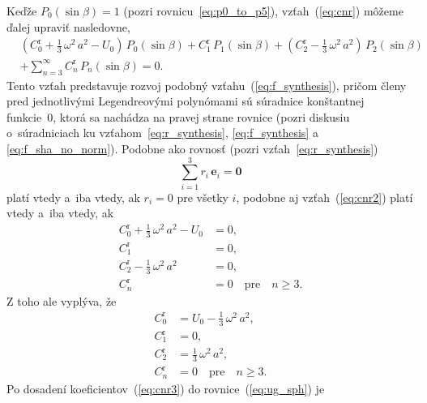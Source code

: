 \documentclass[a4paper,12pt]{book}
\let\vec\mathbf
\begin{document}
Keďže $P_0(\sin\beta) = 1$ (pozri rovnicu~\ref{eq:p0_to_p5}), 
vzťah~(\ref{eq:cnr}) môžeme ďalej upraviť nasledovne,
%
\begin{equation}
\label{eq:cnr2}
\begin{split}
&\left( C_0^\mathrm{r} + \frac{1}{3} \, \omega^2 \, a^2 - U_0 \right) \, 
P_0(\sin\beta) + C_1^\mathrm{r} \, P_1(\sin\beta) + \left(C_2^\mathrm{r} 
- \frac{1}{3} \, \omega^2 \, a^2 \right) \, P_2(\sin\beta)\\
%
&+ \sum_{n = 3}^\infty C^{\mathrm{r}}_n \, P_n(\sin\beta) = 0{.}
\end{split}
\end{equation}
%
Tento vzťah predstavuje rozvoj podobný vzťahu~(\ref{eq:f_synthesis}), pričom 
členy pred jednotlivými Legendreovými polynómami sú súradnice konštantnej 
funkcie~0, ktorá sa nachádza na pravej strane rovnice (pozri diskusiu 
o~súradniciach ku vzťahom~\ref{eq:r_synthesis}, \ref{eq:f_synthesis} 
a \ref{eq:f_sha_no_norm}).  Podobne ako rovnosť (pozri 
vzťah~\ref{eq:r_synthesis})
%
\begin{equation}
\sum_{i = 1}^3 r_i \, \vec{e}_i = \vec{0}
\end{equation}
%
platí vtedy a~iba vtedy, ak $r_i = 0$ pre všetky $i$, podobne aj 
vzťah~(\ref{eq:cnr2}) platí vtedy a~iba vtedy, ak
%
\begin{equation}
\begin{split}
C_0^\mathrm{r} + \frac{1}{3} \, \omega^2 \, a^2 - U_0 &= 0{,}\\
C_1^\mathrm{r}                                        &= 0{,}\\
C_2^\mathrm{r} - \frac{1}{3} \, \omega^2 \, a^2       &= 0{,}\\
C_n^\mathrm{r}                                        &= 0 \quad \textrm{pre} 
\quad n \geq 3{.}
\end{split}
\end{equation}
%
Z toho ale vyplýva, že
%
\begin{equation}
\label{eq:cnr3}
\begin{split}
C_0^\mathrm{r} &= U_0 - \frac{1}{3} \, \omega^2 \, a^2{,}\\
C_1^\mathrm{r} &= 0{,}\\
C_2^\mathrm{r} &= \frac{1}{3} \, \omega^2 \, a^2{,}\\
C_n^\mathrm{r} &= 0 \quad \textrm{pre} \quad n \geq 3{.}
\end{split}
\end{equation}
%
Po dosadení koeficientov~(\ref{eq:cnr3}) do rovnice~(\ref{eq:ug_sph}) je 
\end{document}
